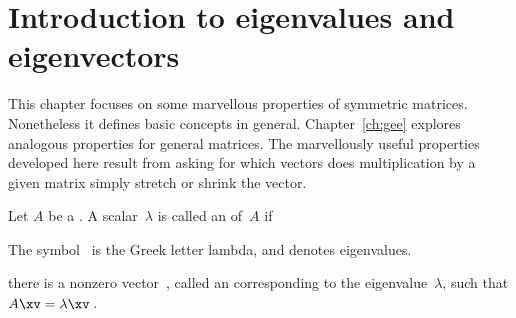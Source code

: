 

\section{Introduction to eigenvalues and eigenvectors}
\label{sec:iee}
\secttoc

\begin{comment}
\pooliv{\S4.1} \layiv{\S5.1} \holti{\S6.1}  \cite[Ch.~8, 11]{Chartier2015}
\end{comment}


This chapter focuses on some marvellous properties of symmetric matrices.  
Nonetheless it defines basic concepts in general.  
Chapter~\ref{ch:gee} explores analogous properties for general matrices.
The marvellously useful properties developed here result from asking for which vectors does multiplication by a given matrix simply stretch or shrink the vector.


\begin{definition} \label{def:evecval}
Let \(A\) be a .  
A scalar~\(\lambda\) is called an  of~\(A\) if 
\begin{aside}
The symbol~\idx{$\lambda$} is the Greek letter lambda, and denotes eigenvalues.
\end{aside}%
there is a nonzero vector~\xv, called an  corresponding to the eigenvalue~\(\lambda\), such that \(A\xv=\lambda\xv\)\,.  
\end{definition}


